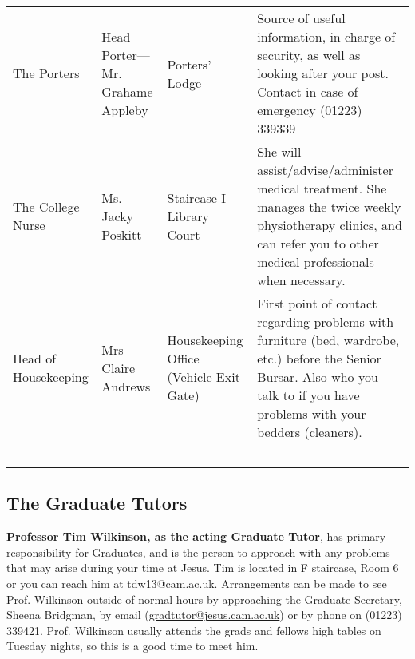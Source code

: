 \documentclass[11pt,fleqn, oneside]{book} %
\begin{document}
\begin{table}
\begin{tabular}{L{2.5cm}L{2cm}L{2cm}L{6cm}}
    The Porters                         & Head Porter—Mr. Grahame Appleby & Porters’ Lodge                          & Source of useful information, in charge of security, as well as looking after your post.  Contact in case of emergency (01223) 339339                                                                                                                                                                                                           \\
    The College Nurse                   & Ms. Jacky Poskitt               & Staircase I Library Court               & She will assist/advise/administer medical treatment. She manages the twice weekly physiotherapy clinics, and can refer you to other medical professionals when necessary.                                                                                                                                                                       \\
    Head of Housekeeping                & Mrs Claire Andrews              & Housekeeping Office (Vehicle Exit Gate) & First point of contact regarding problems with furniture (bed, wardrobe, etc.) before the Senior Bursar. Also who you talk to if you have problems with your bedders (cleaners).                                                                                                                                                                \\
    ~                                   & ~                               & ~                                       & ~                                                                                                                                                                                                                                                                                                                                               \\
    \end{tabular}
\end{table}

\subsection{The Graduate Tutors}

\textbf{Professor Tim Wilkinson, as the acting Graduate Tutor}, has primary responsibility for Graduates, and is the person to approach with any problems that may arise during your time at Jesus. Tim is located in F staircase, Room 6 or you can reach him at tdw13@cam.ac.uk. Arrangements can be made to see Prof. Wilkinson outside of normal hours by approaching the Graduate Secretary, Sheena Bridgman, by email (\url{gradtutor@jesus.cam.ac.uk}) or by phone on (01223) 339421. Prof. Wilkinson usually attends the grads and fellows high tables on Tuesday nights, so this is a good time to meet him.
\end{document}
